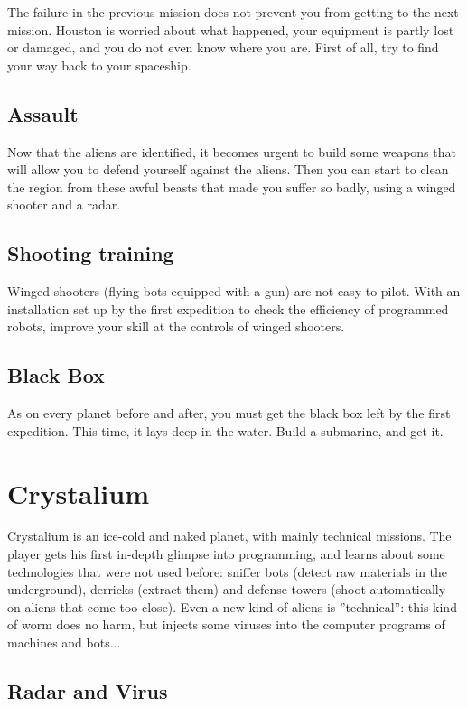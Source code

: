 The failure in the previous mission does not prevent you from getting to the next mission. Houston is worried about what happened, your equipment is partly lost or damaged, and you do not even know where you are. First of all, try to find your way back to your spaceship.


\subsection{Assault}

Now that the aliens are identified, it becomes urgent to build some weapons that will allow you to defend yourself against the aliens. Then you can start to clean the region from these awful beasts that made you suffer so badly, using a winged shooter and a radar.


\subsection{Shooting training}

Winged shooters (flying bots equipped with a gun) are not easy to pilot. With an installation set up by the first expedition to check the efficiency of programmed robots, improve your skill at the controls of winged shooters.


\subsection{Black Box}

As on every planet before and after, you must get the black box left by the first expedition. This time, it lays deep in the water. Build a submarine, and get it.


\newpage
\section{Crystalium}

Crystalium is an ice-cold and naked planet, with mainly technical missions. The player gets his first in-depth glimpse into programming, and learns about some technologies that were not used before: sniffer bots (detect raw materials in the underground), derricks (extract them) and defense towers (shoot automatically on aliens that come too close). Even a new kind of aliens is ''technical'': this kind of worm does no harm, but injects some viruses into the computer programs of machines and bots...


\subsection{Radar and Virus}

